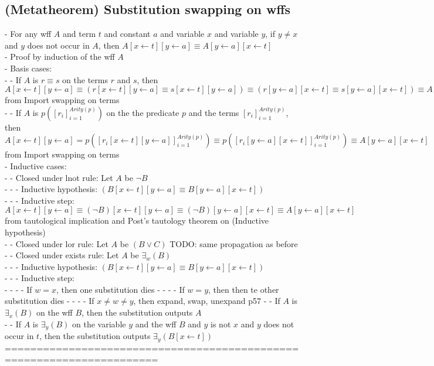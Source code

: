 \documentclass{article}
\begin{document}
\subsection{(Metatheorem) Substitution swapping on wffs}
	- For any wff $A$ and term $t$ and constant $a$ and variable $x$ and variable $y$, if $y \neq x$ and $y$ does not occur in $A$, then $A[x \leftarrow t][y \leftarrow a] \equiv A[y \leftarrow a][x \leftarrow t]$ \\
	- Proof by induction of the wff $A$ \\
	- Basis cases: \\
		- - If $A$ is $r \equiv s$ on the terms $r$ and $s$, then $A[x \leftarrow t][y \leftarrow a] \equiv (r[x \leftarrow t][y \leftarrow a] \equiv s[x \leftarrow t][y \leftarrow a]) \equiv (r[y \leftarrow a][x \leftarrow t] \equiv s[y \leftarrow a][x \leftarrow t]) \equiv A[y \leftarrow a][x \leftarrow t]$ from Import swapping on terms \\
		- - If $A$ is $p([r_i]_{i=1}^{Arity(p)})$ on the the predicate $p$ and the terms $[r_i]_{i=1}^{Arity(p)}$, then $A[x \leftarrow t][y \leftarrow a] = p([r_i[x \leftarrow t][y \leftarrow a]]_{i=1}^{Arity(p)}) \equiv p([r_i[y \leftarrow a][x \leftarrow t]]_{i=1}^{Arity(p)}) \equiv A[y \leftarrow a][x \leftarrow t]$ from Import swapping on terms \\
	- Inductive cases: \\
		- - Closed under lnot rule: Let $A$ be $\lnot B$ \\
			- - - Inductive hypothesis: $(B[x \leftarrow t][y \leftarrow a] \equiv B[y \leftarrow a][x \leftarrow t])$ \\
			- - - Inductive step: $A[x \leftarrow t][y \leftarrow a] \equiv (\lnot B)[x \leftarrow t][y \leftarrow a] \equiv (\lnot B)[y \leftarrow a][x \leftarrow t] \equiv A[y \leftarrow a][x \leftarrow t]$ from tautological implication and Post's tautology theorem on (Inductive hypothesis) \\
		- - Closed under lor rule: Let $A$ be $(B \lor C)$ TODO: same propagation as before \\
		- - Closed under exists rule: Let $A$ be $\exists_w(B)$ \\
			- - - Inductive hypothesis: $(B[x \leftarrow t][y \leftarrow a] \equiv B[y \leftarrow a][x \leftarrow t])$ \\
			- - - Inductive step: \\
				- - - - If $w = x$, then one substitution dies
				- - - - If $w = y$, then then te other substitution dies
				- - - - If $x \neq w \neq y$, then expand, swap, unexpand p57
 		- - If $A$ is $\exists_x(B)$ on the wff $B$, then the substitution outputs $A$ \\
		- - If $A$ is $\exists_y(B)$ on the variable $y$ and the wff $B$ and $y$ is not $x$ and $y$ does not occur in $t$, then the substitution outputs $\exists_y(B[x \leftarrow t])$\\
	======================================================================
\end{document}
